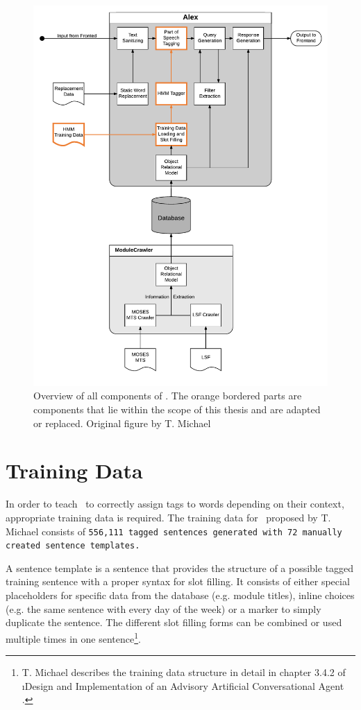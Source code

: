 \begin{figure}[H]
	\includegraphics[width=\textwidth]{images/alex_components}
	\caption[Component Overview of \Alex]{Overview of all components of \Alex. The orange bordered parts are components that lie within the scope of this thesis and are adapted or replaced. Original figure by T. Michael \cite{michael2016}}
	\label{f.alex.components}
\end{figure}

\section{Training Data}\label{c.alex.data}
In order to teach \Alex\ to correctly assign tags to words depending on their context, appropriate training data is required. The training data for \Alex\ proposed by T. Michael consists of \tt{556,111} tagged sentences generated with \tt{72} manually created sentence templates.

A sentence template is a sentence that provides the structure of a possible tagged training sentence with a proper syntax for slot filling. It consists of either special placeholders for specific data from the database (e.g. module titles), inline choices (e.g. the same sentence with every day of the week) or a marker to simply duplicate the sentence. The different slot filling forms can be combined or used multiple times in one sentence\footnote{T. Michael describes the training data structure in detail in chapter 3.4.2 of \i{Design and Implementation of an Advisory Artificial Conversational Agent} \cite{michael2016}.}.

